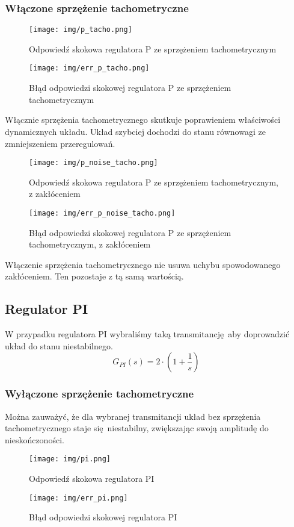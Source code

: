 \documentclass[a4paper, 12pt, titlepage]{article}
\begin{document}
			\subsubsection{Włączone sprzężenie tachometryczne}
				\begin{figure}[H]
					\centering
					\texttt{[image: img/p\_tacho.png]}
					\caption{Odpowiedź skokowa regulatora P ze sprzężeniem tachometrycznym}
				\end{figure}
				\begin{figure}[H]
					\centering
					\texttt{[image: img/err\_p\_tacho.png]}
					\caption{Błąd odpowiedzi skokowej regulatora P ze sprzężeniem tachometrycznym}
				\end{figure}
				Włącznie sprzężenia tachometrycznego skutkuje poprawieniem właściwości dynamicznych układu. Układ szybciej dochodzi do stanu równowagi ze zmniejszeniem przeregulowań.
				\begin{figure}[H]
					\centering
					\texttt{[image: img/p\_noise\_tacho.png]}
					\caption{Odpowiedź skokowa regulatora P ze sprzężeniem tachometrycznym, z zakłóceniem}
				\end{figure}
				\begin{figure}[H]
					\centering
					\texttt{[image: img/err\_p\_noise\_tacho.png]}
					\caption{Błąd odpowiedzi skokowej regulatora P ze sprzężeniem tachometrycznym, z zakłóceniem}
				\end{figure} \noindent
				Włączenie sprzężenia tachometrycznego nie usuwa uchybu spowodowanego zakłóceniem. Ten pozostaje z tą samą wartością.
		\subsection{Regulator PI}
			W przypadku regulatora PI wybraliśmy taką transmitancję aby doprowadzić układ do stanu niestabilnego.
			$$
				G_{PI}(s) = 2 \cdot (1 + \frac{1}{s})
			$$
			\subsubsection{Wyłączone sprzężenie tachometryczne}
				Można zauważyć, że dla wybranej transmitancji układ bez sprzężenia tachometrycznego staje się niestabilny, zwiększając swoją amplitudę do nieskończoności.
				\begin{figure}[H]
					\centering
					\texttt{[image: img/pi.png]}
					\caption{Odpowiedź skokowa regulatora PI}
				\end{figure}
				\begin{figure}[H]
					\centering
					\texttt{[image: img/err\_pi.png]}
					\caption{Błąd odpowiedzi skokowej regulatora PI}
				\end{figure}
\end{document}
